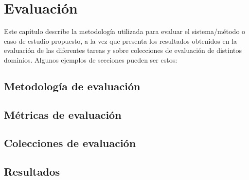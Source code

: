 
\chapter{Evaluación}
\label{ch:Evaluacion}

\noindent Este capítulo describe la metodología utilizada para evaluar el sistema/método o caso de estudio propuesto, a la vez que presenta los resultados obtenidos en la evaluación de las diferentes tareas y sobre colecciones de evaluación de distintos dominios. Algunos ejemplos de secciones pueden ser estos:

\section{Metodología de evaluación}
\label{sec:Met_Eval}

\section{Métricas de evaluación}
\label{sec:Metric_Eval}

\section{Colecciones de evaluación}
\label{sec:Col_Eval}

\section{Resultados}
\label{sec:Resultados}